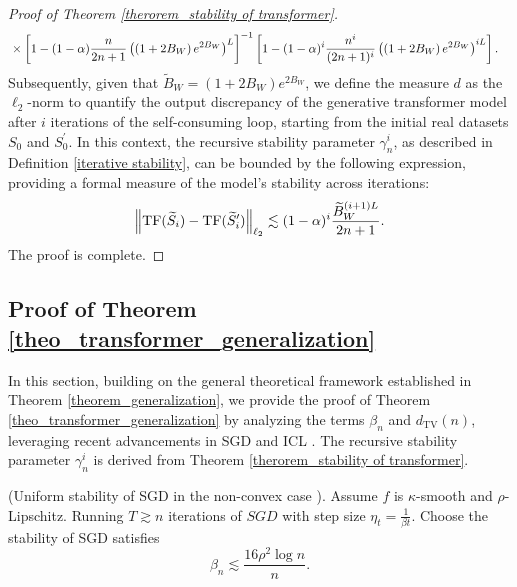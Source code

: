 \begin{proof}[Proof of Theorem \ref{therorem_stability of transformer}]
\begin{align}
    &\times \left[1-(1-\alpha) \frac{ n}{2 n+1}\left(\left(1+2 B_W\right) e^{2 B_W}\right)^L\right]^{-1}\left[1-(1-\alpha)^i \frac{ n^i}{(2 n+1)^i}\left(\left(1+2 B_W\right) e^{2 B_W}\right)^{i L}\right] \notag.
\end{align}
Subsequently, given that $\widetilde{B}_W=(1+2B_W) e^{2B_W}$, we define the measure $d$ as the $\ell_2$-norm to quantify the output discrepancy of the generative transformer model after $i$ iterations of the self-consuming loop, starting from the initial real datasets $S_0$ and $S_0^{\prime}$. In this context, the recursive stability parameter $\gamma_n^i$, as described in Definition \ref{iterative stability}, can be bounded by the following expression, providing a formal measure of the model's stability across iterations:
\begin{align}
    \left\|\operatorname{TF}(\widetilde{S}_i)-\operatorname{TF}(\widetilde{S}_i^{\prime})\right\|_{\ell_2}\lesssim 
   (1-\alpha)^i \frac{\widetilde{B}_W^{(i+1)L}}{2n+1}\notag .
\end{align}
The proof is complete.

\end{proof}






























\subsection{Proof of Theorem \ref{theo_transformer_generalization}}
In this section, building on the general theoretical framework established in Theorem \ref{theorem_generalization}, we provide the proof of Theorem \ref{theo_transformer_generalization} by analyzing the terms $\beta_n$ and $d_{\mathrm{TV}}(n)$, leveraging recent advancements in SGD \citep{zhang2022stability} and ICL \citep{zhang2023and}. The recursive stability parameter $\gamma_n^i$ is derived from Theorem \ref{therorem_stability of transformer}.

\begin{lemma}(Uniform stability of SGD in the non-convex case \citep{zhang2022stability})\label{lemma_sgd}. Assume $f$ is $\kappa$-smooth and $\rho$-Lipschitz. Running $T \gtrsim n$ iterations of $S G D$ with step size $\eta_t=\frac{1}{\beta t}$. Choose the stability of SGD satisfies
$$
\beta_n \lesssim \frac{16 \rho^2 \log n}{n}.
$$
\end{lemma}


